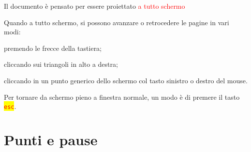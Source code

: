\documentclass[12pt,italian,oneside]{report}
\newcommand{\rosso}[1]{\textcolor{red}{#1}}
\newcommand{\sfondogiallo}[1]{\colorbox{yellow}{#1}}
\begin{document}
\begin{firstheadlineitemize}

\item Il documento \`e pensato per essere proiettato \rosso{a tutto schermo}

\pause

\begin{secondheadlineitemize}

\item Quando a tutto schermo, si possono avanzare o retrocedere le pagine in vari modi:


\begin{thirdheadlineitemize}

\pause

\item premendo le frecce della tastiera;

\pause

\item cliccando sui triangoli \indietro{} \avanti{} in alto a destra;

\pause

\item cliccando in un punto generico dello schermo col tasto sinistro o destro del mouse.

\end{thirdheadlineitemize}

\pause

\item Per tornare da schermo pieno a finestra normale, un modo \`e di premere il tasto \sfondogiallo{\rosso{\texttt{esc}}}.

\end{secondheadlineitemize}

\end{firstheadlineitemize}


\section{Punti e pause}
\end{document}
